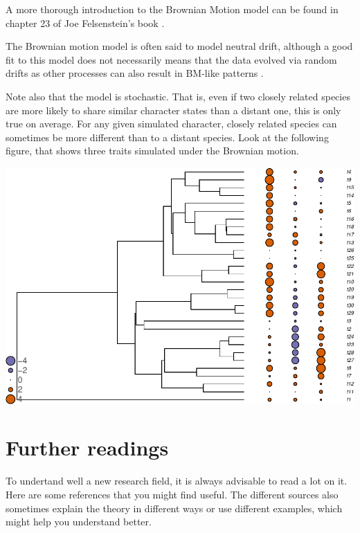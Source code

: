 \documentclass[
]{book}
\begin{document}
A more thorough introduction to the Brownian Motion model can be found in chapter 23 of Joe Felsenstein's book \citep{felsenstein2004inferring}.

The Brownian motion model is often said to model neutral drift, although a good fit to this model does not necessarily means that the data evolved via random drifts as other processes can also result in BM-like patterns \citep{hansen1996translating}.

Note also that the model is stochastic. That is, even if two closely related species are more likely to share similar character states than a distant one, this is only true on average. For any given simulated character, closely related species can sometimes be more different than to a distant species. Look at the following figure, that shows three traits simulated under the Brownian motion.

\begin{center}\includegraphics{pcm-workshop_files/figure-latex/PlotContinuousParameter_tablephylo4d-1} \end{center}

\chapter{Further readings}\label{further-readings}

To undertand well a new research field, it is always advisable to read a lot on it. Here are some references that you might find useful. The different sources also sometimes explain the theory in different ways or use different examples, which might help you understand better.
\end{document}
